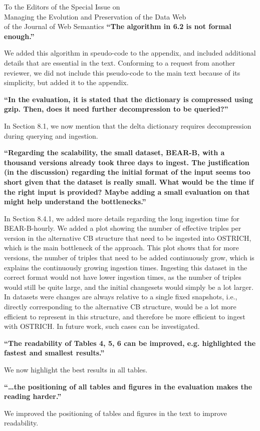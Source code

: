 \documentclass{letter}
\begin{document}
\begin{letter}{To the Editors of the Special Issue on\\Managing the Evolution and Preservation of the Data Web\\of the Journal of Web Semantics}
\textbf{\enquote{The algorithm in 6.2 is not formal enough.}}

We added this algorithm in speudo-code to the appendix,
and included additional details that are essential in the text.
Conforming to a request from another reviewer, we did not include this pseudo-code to the main text because of its simplicity,
but added it to the appendix.

\textbf{\enquote{In the evaluation, it is stated that the dictionary is compressed using gzip. Then, does it need further decompression to be queried?}}

In Section 8.1, we now mention that the delta dictionary requires decompression during querying and ingestion.

\textbf{\enquote{Regarding the scalability, the small dataset, BEAR-B, with a thousand versions already took three days to ingest. The justification (in the discussion) regarding the initial format of the input seems too short given that the dataset is really small. What would be the time if the right input is provided? Maybe adding a small evaluation on that might help understand the bottlenecks.}}

In Section 8.4.1, we added more details regarding the long ingestion time for BEAR-B-hourly.
We added a plot showing the number of effective triples per version in the alternative CB structure that need to be ingested into OSTRICH,
which is the main bottleneck of the approach.
This plot shows that for more versions, the number of triples that need to be added continuously grow,
which is explains the continuously growing ingestion times.
Ingesting this dataset in the correct format would not have lower ingestion times,
as the number of triples would still be quite large, and the initial changesets would simply be a lot larger.
In datasets were changes are always relative to a single fixed snapshots, i.e., directly corresponding to the alternative CB structure,
would be a lot more efficient to represent in this structure, and therefore be more efficient to ingest with OSTRICH.
In future work, such cases can be investigated.

\textbf{\enquote{The readability of Tables 4, 5, 6 can be improved, e.g. highlighted the fastest and smallest results.}}

We now highlight the best results in all tables.

\textbf{\enquote{\ldots the positioning of all tables and figures in the evaluation makes the reading harder.}}

We improved the positioning of tables and figures in the text to improve readability.


\end{letter}
\end{document}
